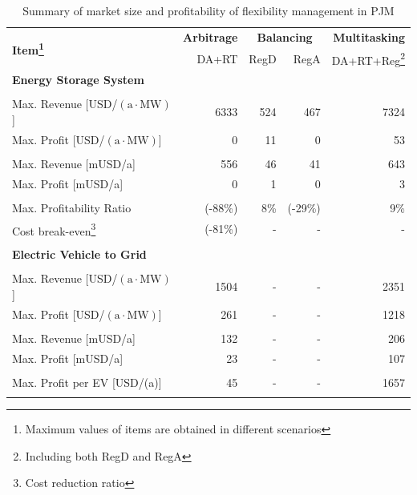 \begin{table}
	\centering
	\begin{tabular}{l r r r r}
		\hline
		\multirow{2}{*}{\textbf{Item\footnote{Maximum values of items are obtained in different scenarios}}}& \textbf{Arbitrage} & \multicolumn{2}{c}{\textbf{Balancing}} & \textbf{Multitasking} \\
		\multirow{2}{*}{}& DA+RT & RegD & RegA & DA+RT+Reg\footnote{Including both RegD and RegA}\\
		\hline
		\multicolumn{5}{l}{\textbf{Energy Storage System}} \\
		& & & & \\
		Max. Revenue [USD/$(\text{a} \cdot \text{MW})$] & \num{6333} & \num{524} & \num{467} & \num{7324} \\
		Max. Profit [USD/$(\text{a} \cdot \text{MW})$] & 0 & 11 & 0 & 53\\
		& & & &\\
		Max. Revenue [mUSD/a] & \num{556} & \num{46} & \num{41} & \num{643}\\
		Max. Profit [mUSD/a] & 0 & 1 & 0 & 3\\
		& & & & \\
		Max. Profitability Ratio & (-88\%) & 8\% & (-29\%) & 9\%\\
		Cost break-even\footnote{Cost reduction ratio} & (-81\%) & - & - & -\\
		& & & & \\
		\hline
		\multicolumn{5}{l}{\textbf{Electric Vehicle to Grid}} \\
		& & & & \\
		Max. Revenue [USD/$(\text{a} \cdot \text{MW})$] & \num{1504} & - &  - & \num{2351}\\
		Max. Profit [USD/$(\text{a} \cdot \text{MW})$] & 261 & - & - & \num{1218} \\
		& & & & \\
		Max. Revenue [mUSD/a] & \num{132} & - &  - & \num{206}\\
		Max. Profit [mUSD/a] & \num{23} & - &  - & \num{107} \\
		& & &  & \\
		Max. Profit per EV [USD/(a)] & \num{45} & - & - &\num{1657}\\
		& & & & \\
		\hline
	\end{tabular}
	\caption{Summary of market size and profitability of flexibility management in PJM}\label{tab:pjm-summary}
\end{table}

